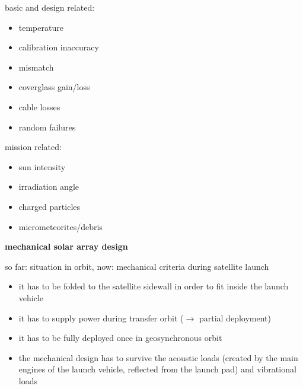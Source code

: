 \noindent basic and design related:
 \begin{itemize}
  \item temperature
  \item calibration inaccuracy
  \item mismatch
  \item coverglass gain/loss
  \item cable losses
  \item random failures
 \end{itemize}

\noindent mission related:
 \begin{itemize}
  \item sun intensity
  \item irradiation angle
  \item charged particles 
  \item micrometeorites/debris
 \end{itemize}
\textbf{mechanical solar array design} 
\vspace*{3pt}

\noindent so far: situation in orbit, now: mechanical criteria during satellite launch
 \begin{itemize}
  \item it has to be folded to the satellite sidewall in order to fit inside the launch vehicle
  \item it has to supply power during transfer orbit ($\rightarrow$ partial deployment)
  \item it has to be fully deployed once in geosynchronous orbit
  \item the mechanical design has to survive the acoustic loads (created by the main engines of the launch vehicle, reflected from the launch pad) and vibrational loads
 \end{itemize}
